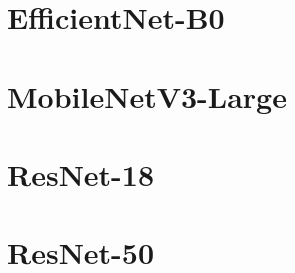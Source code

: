 

























\section{EfficientNet-B0}



\section{MobileNetV3-Large}



\section{ResNet-18}



\section{ResNet-50}


